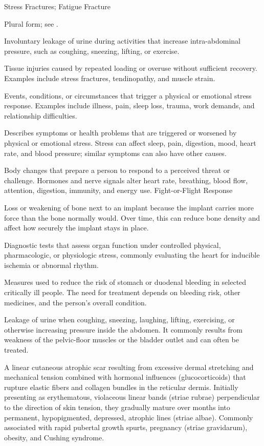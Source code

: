 \synonyms
Stress Fractures; Fatigue Fracture

 Plural form; see .

 Involuntary leakage of urine during activities that increase intra-abdominal pressure, such as coughing, sneezing, lifting, or exercise.

 Tissue injuries caused by repeated loading or overuse without sufficient recovery. Examples include stress fractures, tendinopathy, and muscle strain.

 Events, conditions, or circumstances that trigger a physical or emotional stress response. Examples include illness, pain, sleep loss, trauma, work demands, and relationship difficulties.

 Describes symptoms or health problems that are triggered or worsened by physical or emotional stress. Stress can affect sleep, pain, digestion, mood, heart rate, and blood pressure; similar symptoms can also have other causes.

 Body changes that prepare a person to respond to a perceived threat or challenge. Hormones and nerve signals alter heart rate, breathing, blood flow, attention, digestion, immunity, and energy use.
\synonyms
Fight-or-Flight Response

 Loss or weakening of bone next to an implant because the implant carries more force than the bone normally would. Over time, this can reduce bone density and affect how securely the implant stays in place.

 Diagnostic tests that assess organ function under controlled physical, pharmacologic, or physiologic stress, commonly evaluating the heart for inducible ischemia or abnormal rhythm.

 Measures used to reduce the risk of stomach or duodenal bleeding in selected critically ill people. The need for treatment depends on bleeding risk, other medicines, and the person's overall condition.

 Leakage of urine when coughing, sneezing, laughing, lifting, exercising, or otherwise increasing pressure inside the abdomen. It commonly results from weakness of the pelvic-floor muscles or the bladder outlet and can often be treated.

 A linear cutaneous atrophic scar resulting from excessive dermal stretching and mechanical tension combined with hormonal influences (glucocorticoids) that rupture elastic fibers and collagen bundles in the reticular dermis. Initially presenting as erythematous, violaceous linear bands (striae rubrae) perpendicular to the direction of skin tension, they gradually mature over months into permanent, hypopigmented, depressed, atrophic lines (striae albae). Commonly associated with rapid pubertal growth spurts, pregnancy (striae gravidarum), obesity, and Cushing syndrome.

